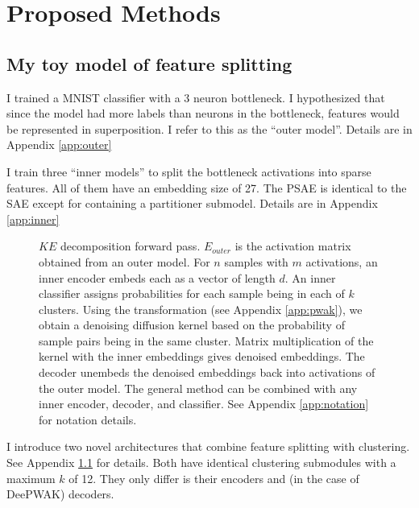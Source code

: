 \section{Proposed Methods}
\subsection{My toy model of feature splitting}
I trained a MNIST classifier with a 3 neuron bottleneck.
I hypothesized that since the model had more labels than neurons in the bottleneck, features would be represented in superposition.
I refer to this as the ``outer model''.
Details are in Appendix \ref{app:outer}

I train three ``inner models'' to split the bottleneck activations into sparse features.
All of them have an embedding size of 27.
The PSAE is identical to the SAE except for containing a partitioner submodel.
Details are in Appendix \ref{app:inner}


\begin{figure}
    \centering
        
     
     \caption{
     $KE$ decomposition forward pass. 
     $E_{outer}$ is the activation matrix obtained from an outer model.
     For $n$ samples with $m$ activations, an inner encoder embeds each as a vector of length $d$.
     An inner classifier assigns probabilities for each sample being in each of $k$ clusters.
     Using the \PWAK transformation (see Appendix \ref{app:pwak}), 
     we obtain a denoising diffusion kernel based on the probability of sample pairs being in the same cluster.
     Matrix multiplication of the kernel with the inner embeddings gives denoised embeddings.
     The decoder unembeds the denoised embeddings back into activations of the outer model.
     The general method can be combined with any inner encoder, decoder, and classifier.
     See Appendix \ref{app:notation} for notation details.
     }
     \label{fig:deepwak}
\end{figure}

    
I introduce two novel architectures that combine feature splitting with clustering. See Appendix \ref{} for details.
Both have identical clustering submodules with a maximum $k$ of 12.
They only differ is their encoders and (in the case of DeePWAK) decoders.

